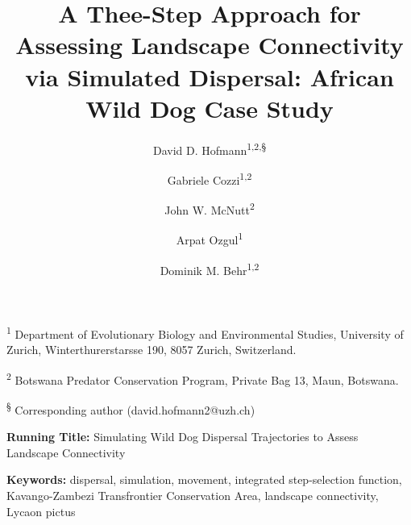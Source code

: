 \documentclass[abstract=on,10pt,a4paper,bibliography=totocnumbered]{article}
\title{A Thee-Step Approach for Assessing Landscape Connectivity via Simulated
Dispersal: African Wild Dog Case Study}
\author{
  David D. Hofmann\textsuperscript{1,2,\S} \and
  Gabriele Cozzi\textsuperscript{1,2} \and
  John W. McNutt\textsuperscript{2} \and
  Arpat Ozgul\textsuperscript{1} \and
  Dominik M. Behr\textsuperscript{1,2}
}
\begin{document}



\maketitle

\begin{flushleft}

\vspace{0.5cm}

\textsuperscript{1} Department of Evolutionary Biology and Environmental
Studies, University of Zurich, Winterthurerstarsse 190, 8057 Zurich,
Switzerland.

\textsuperscript{2} Botswana Predator Conservation Program, Private Bag 13,
Maun, Botswana.

\textsuperscript{\S} Corresponding author (david.hofmann2@uzh.ch)

\vspace{4cm}

\textbf{Running Title:} Simulating Wild Dog Dispersal Trajectories to Assess
Landscape Connectivity

\vspace{0.5cm}

\textbf{Keywords:} dispersal, simulation, movement, integrated step-selection
function, Kavango-Zambezi Transfrontier Conservation Area, landscape
connectivity, Lycaon pictus

\end{flushleft}
\end{document}

